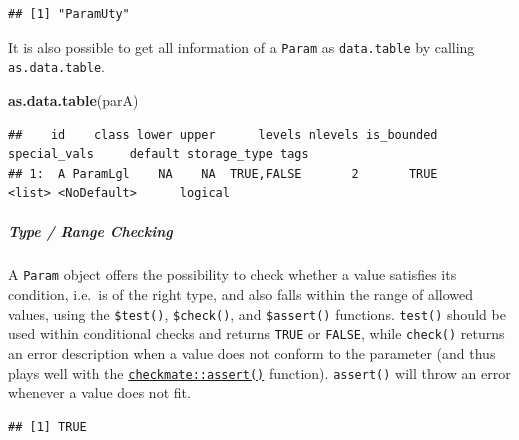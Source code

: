 \documentclass[]{article}
\newenvironment{Shaded}{\begin{snugshade}}{\end{snugshade}}
\newcommand{\KeywordTok}[1]{\textcolor[rgb]{0.13,0.29,0.53}{\textbf{#1}}}
\newcommand{\NormalTok}[1]{#1}
\newcommand{\OperatorTok}[1]{\textcolor[rgb]{0.81,0.36,0.00}{\textbf{#1}}}
\newcommand{\OtherTok}[1]{\textcolor[rgb]{0.56,0.35,0.01}{#1}}
\newcommand{\StringTok}[1]{\textcolor[rgb]{0.31,0.60,0.02}{#1}}
\let\oldsubparagraph\subparagraph
\renewcommand{\subparagraph}[1]{\oldsubparagraph{#1}\mbox{}}
\renewenvironment{Shaded} {\begin{snugshade}\small} {\end{snugshade}}
\begin{document}
\begin{verbatim}
## [1] "ParamUty"
\end{verbatim}

It is also possible to get all information of a \texttt{Param} as \texttt{data.table} by calling \texttt{as.data.table}.

\begin{Shaded}
\begin{Highlighting}[]
\KeywordTok{as.data.table}\NormalTok{(parA)}
\end{Highlighting}
\end{Shaded}

\begin{verbatim}
##    id    class lower upper      levels nlevels is_bounded special_vals     default storage_type tags
## 1:  A ParamLgl    NA    NA  TRUE,FALSE       2       TRUE       <list> <NoDefault>      logical
\end{verbatim}

\hypertarget{type-range-checking}{%
\subparagraph{Type / Range Checking}\label{type-range-checking}}

A \texttt{Param} object offers the possibility to check whether a value satisfies its condition, i.e.~is of the right type, and also falls within the range of allowed values, using the \texttt{\$test()}, \texttt{\$check()}, and \texttt{\$assert()} functions.
\texttt{test()} should be used within conditional checks and returns \texttt{TRUE} or \texttt{FALSE}, while \texttt{check()} returns an error description when a value does not conform to the parameter (and thus plays well with the \href{https://www.rdocumentation.org/packages/checkmate/topics/assert}{\texttt{checkmate::assert()}} function).
\texttt{assert()} will throw an error whenever a value does not fit.

\begin{Shaded}
\end{Shaded}

\begin{verbatim}
## [1] TRUE
\end{verbatim}

\begin{Shaded}
\end{Shaded}
\end{document}
